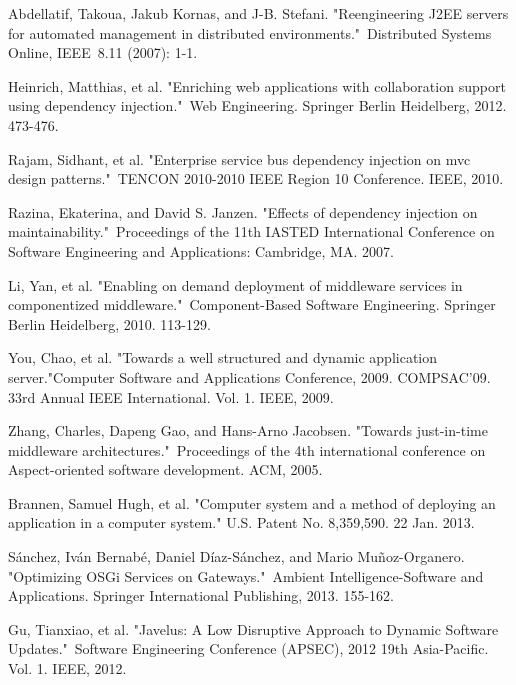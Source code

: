 \documentclass[conference]{IEEEtran}
\begin{document}
\begin{thebibliography}{9}
Abdellatif, Takoua, Jakub Kornas, and J-B. Stefani. "Reengineering J2EE servers for automated management in distributed environments." Distributed Systems Online, IEEE 8.11 (2007): 1-1.

Heinrich, Matthias, et al. "Enriching web applications with collaboration support using dependency injection." Web Engineering. Springer Berlin Heidelberg, 2012. 473-476.

Rajam, Sidhant, et al. "Enterprise service bus dependency injection on mvc design patterns." TENCON 2010-2010 IEEE Region 10 Conference. IEEE, 2010.

Razina, Ekaterina, and David S. Janzen. "Effects of dependency injection on maintainability." Proceedings of the 11th IASTED International Conference on Software Engineering and Applications: Cambridge, MA. 2007.

Li, Yan, et al. "Enabling on demand deployment of middleware services in componentized middleware." Component-Based Software Engineering. Springer Berlin Heidelberg, 2010. 113-129.

You, Chao, et al. "Towards a well structured and dynamic application server."Computer Software and Applications Conference, 2009. COMPSAC'09. 33rd Annual IEEE International. Vol. 1. IEEE, 2009.

Zhang, Charles, Dapeng Gao, and Hans-Arno Jacobsen. "Towards just-in-time middleware architectures." Proceedings of the 4th international conference on Aspect-oriented software development. ACM, 2005.

Brannen, Samuel Hugh, et al. "Computer system and a method of deploying an application in a computer system." U.S. Patent No. 8,359,590. 22 Jan. 2013.

Sánchez, Iván Bernabé, Daniel Díaz-Sánchez, and Mario Muñoz-Organero. "Optimizing OSGi Services on Gateways." Ambient Intelligence-Software and Applications. Springer International Publishing, 2013. 155-162.

Gu, Tianxiao, et al. "Javelus: A Low Disruptive Approach to Dynamic Software Updates." Software Engineering Conference (APSEC), 2012 19th Asia-Pacific. Vol. 1. IEEE, 2012.

\end{thebibliography}


\end{document}

